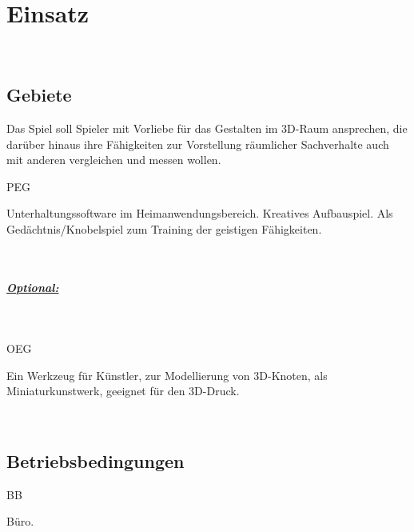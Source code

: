 %
%


\chapter{Einsatz}
\label{ES}~\\


\section{Gebiete}
\label{ES:Gebiete}

Das Spiel soll Spieler mit Vorliebe für das Gestalten im 3D-Raum ansprechen, die darüber hinaus ihre Fähigkeiten zur Vorstellung räumlicher Sachverhalte auch mit anderen vergleichen und messen wollen.\\


\begin{ids}{\gls{PEG}}

	\id[10] Unterhaltungssoftware im Heimanwendungsbereich.
	\id[20] Kreatives Aufbauspiel.
	\id[30] Als Gedächtnis/Knobelspiel zum Training der geistigen Fähigkeiten.

\end{ids}

~\\


\paragraph*{\underline{Optional:}}~\\

\begin{ids}{\gls{OEG}}

	\id[10] Ein Werkzeug für Künstler, zur Modellierung von 3D-Knoten, als Miniaturkunstwerk, geeignet für den 3D-Druck.

\end{ids}


%
%
~\\

\section{Betriebsbedingungen}
\label{ES:BB}

\begin{ids}{\gls{BB}}

	\id[10] Büro.

\end{ids}


